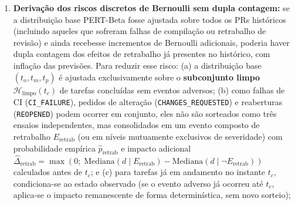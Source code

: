 \documentclass[12pt,openany,oneside,a4paper,english,brazilian,sumario=tradicional]{abntex2}
\begin{document}
\begin{enumerate}
\begin{itemize}
  \end{itemize}
  O suporte da PERT-Beta é limitado a $[t_o,t_p]$. Durações reais futuras podem ultrapassar $t_p$. Para evitar instabilidade em classes com poucos itens, exige-se tamanho amostral mínimo $n_{\text{classe}} \ge 15$ itens concluídos por rótulo; classes com $n_{\text{classe}} < 15$ recorrem ao conjunto histórico global ($n_{\text{global}} \ge 30$). A aderência empírica é avaliada pela distância $D_n$, gráficos quantil-quantil (QQ-\textit{plots}) e \textit{bootstrap} paramétrico ($B=1.000$), sem usar $p$-valores assintóticos de KS sobre parâmetros estimados da mesma amostra;
  \item \textbf{Derivação dos riscos discretos de Bernoulli sem dupla contagem:} se a distribuição base PERT-Beta fosse ajustada sobre todos os PRs históricos (incluindo aqueles que sofreram falhas de compilação ou retrabalho de revisão) e ainda recebesse incrementos de Bernoulli adicionais, poderia haver dupla contagem dos efeitos de retrabalho já presentes no histórico, com inflação das previsões. Para reduzir esse risco: (a) a distribuição base $(t_o, t_m, t_p)$ é ajustada exclusivamente sobre o \textbf{subconjunto limpo} $\mathcal{H}_{\text{limpo}}(t_c)$ de tarefas concluídas sem eventos adversos; (b) como falhas de CI (\texttt{CI\_\allowbreak FAILURE}), pedidos de alteração (\texttt{CHANGES\_\allowbreak REQUESTED}) e reaberturas (\texttt{REOPENED}) podem ocorrer em conjunto, eles não são sorteados como três ensaios independentes, mas consolidados em um evento composto de retrabalho $E_{\text{retrab}}$ (ou em níveis mutuamente exclusivos de severidade) com probabilidade empírica $\hat{p}_{\text{retrab}}$ e impacto adicional $\hat{\Delta}_{\text{retrab}} = \max(0;\; \mathrm{Mediana}(d \mid E_{\text{retrab}}) - \mathrm{Mediana}(d \mid \neg E_{\text{retrab}}))$ calculados antes de $t_c$; e (c) para tarefas já em andamento no instante $t_c$, condiciona-se ao estado observado (se o evento adverso já ocorreu até $t_c$, aplica-se o impacto remanescente de forma determinística, sem novo sorteio);

\end{enumerate}
\end{document}
